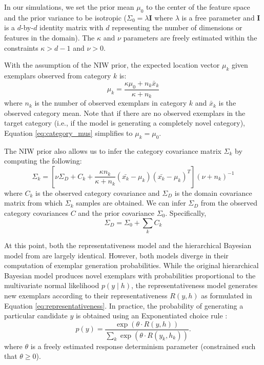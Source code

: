 \documentclass[pdflatex,sn-apa]{sn-jnl}%
\theoremstyle{thmstyleone}%
\theoremstyle{thmstyletwo}%
\theoremstyle{thmstylethree}%
\begin{document}
In our simulations, we set the prior mean $\mu_0$ to the center of the feature
space and the prior variance to be isotropic ($\Sigma_0 = \lambda \mathbf{I}$ where
$\lambda$ is a free parameter and $\mathbf{I}$ is a $d$-by-$d$ identity matrix
with $d$ representing the number of dimensions or features in the domain). The
$\kappa$ and $\nu$ parameters are freely estimated within the constraints
$\kappa > d-1$ and $\nu > 0$.

With the assumption of the NIW prior, the expected location vector $\mu_k$ given exemplars observed from category $k$ is:
\begin{equation}
  \mu_k = \dfrac
    {\kappa\mu_{0} + n_k \bar{x}_k}
    {\kappa + n_k}
    \label{eq:category_mus}
\end{equation}
where $n_k$ is the number of observed exemplars in category $k$ and $\bar{x}_k$
is the observed category mean. Note that if there are no observed exemplars in
the target category (i.e., if the model is generating a completely novel
category), Equation \ref{eq:category_mus} simplifies to $\mu_k = \mu_0$.

The NIW prior also allows us to infer the category covariance matrix $\Sigma_k$
by computing the following:
\begin{equation}
  \Sigma_k = [\nu \Sigma_D+ C_k +
    \dfrac
    {\kappa n_k}
    {\kappa + n_k}
    (\bar{x_k}-\mu_k)(\bar{x_k}-\mu_k)^T
  ] (\nu + n_k)^{-1}
  \label{eq:Sigma_y}
\end{equation}
where $C_k$ is the observed category covariance and $\Sigma_D$ is the domain
covariance matrix from which $\Sigma_k$ samples are obtained. We can
infer $\Sigma_D$ from the observed category covariances $C$ and the prior
covariance $\Sigma_0$. Specifically,
\begin{equation}
    \Sigma_D = \Sigma_0 + \sum_{k}{C_k}
\end{equation}

At this point, both the representativeness model and the hierarchical Bayesian
model from \cite{jern2013probabilistic} are largely identical. However, both
models diverge in their computation of exemplar generation probabilities. While
the original hierarchical Bayesian model produces novel exemplars with
probabilities proportional to the multivariate normal likelihood $p(y \mid h)$, the
representativeness model generates new exemplars according to their representativeness $R(y,h)$ as formulated in Equation \ref{eq:representativeness}. In practice, the probability of generating a
particular candidate $y$ is obtained using an Exponentiated
choice rule \citep{luce1977choice}:
\begin{equation}
  p(y) = \dfrac
    {\exp( \theta \cdot R(y,h))}
    {\sum_k \exp(\theta  \cdot R(y_k,h_k))} .
\label{eq:representative-choice}
\end{equation}
where $\theta$ is a freely estimated response determinism parameter (constrained
such that $\theta \geq 0$).
\end{document}
